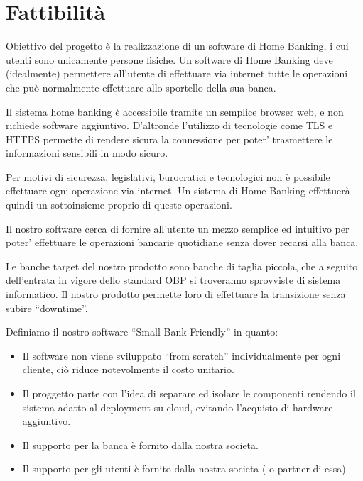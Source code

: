 \documentclass[10pt]{softeng} %
\begin{document}
\startofdocument{}


\section{Fattibilit\`a}

Obiettivo del progetto \`e la realizzazione di un software di Home Banking, i cui utenti sono unicamente persone fisiche.
Un software di Home Banking deve (idealmente) permettere all'utente di effettuare via internet tutte le operazioni che pu\`o normalmente effettuare allo sportello della sua banca.

Il sistema home banking \`e accessibile tramite un semplice browser web, e non richiede software aggiuntivo.
D'altronde l'utilizzo di tecnologie come TLS e HTTPS permette di rendere sicura la connessione per poter' trasmettere le informazioni sensibili in modo sicuro.


Per motivi di sicurezza, legislativi, burocratici e tecnologici non \`e possibile effettuare ogni operazione via internet.
Un sistema di Home Banking effettuer\`a quindi un sottoinsieme proprio di queste operazioni.

Il nostro software cerca di fornire all'utente un mezzo semplice ed intuitivo per poter' effettuare le operazioni bancarie quotidiane senza dover recarsi alla banca.

Le banche target del nostro prodotto sono banche di taglia piccola, che a seguito dell'entrata in vigore dello standard OBP si troveranno sprovviste di sistema informatico. Il nostro prodotto permette loro di effettuare la transizione senza subire ``downtime''.

Definiamo il nostro software ``Small Bank Friendly'' in quanto:
\begin{itemize}
    \item Il software non viene sviluppato ``from scratch'' individualmente per ogni cliente, ci\`o riduce notevolmente il costo unitario.
    \item Il proggetto parte con l'idea di separare ed isolare le componenti rendendo il sistema adatto al deployment su cloud, evitando l'acquisto di hardware aggiuntivo.
    \item Il supporto per la banca \`e fornito dalla nostra societa.
    \item Il supporto per gli utenti \`e fornito dalla nostra societa ( o partner di essa)
\end {itemize}
\end{document}
